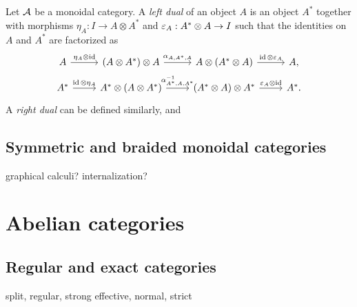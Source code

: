 \documentclass{../../large}
\begin{document}
\section{}

\begin{prb}
\end{prb}


\begin{prb}
Let $\mathcal{A}$ be a monoidal category.
A \emph{left dual} of an object $A$ is an object $A^*$ together with morphisms $\eta_A:I\to A\otimes A^*$ and $\varepsilon_A:A^*\otimes A\to I$ such that the identities on $A$ and $A^*$ are factorized as
\[\begin{tikzcd}[row sep=small]
A \rar{\eta_A\otimes\id} & (A\otimes A^*)\otimes A \rar{\alpha_{A,A^*,A}} & A\otimes(A^*\otimes A) \rar{\id\otimes\e_A} & A,\\
A^* \rar{\id\otimes\eta_A} & A^*\otimes(A\otimes A^*) \rar{\alpha_{A^*,A,A^*}^{-1}} & (A^*\otimes A)\otimes A^* \rar{\e_A\otimes\id} & A^*.
\end{tikzcd}\]
A \emph{right dual} can be defined similarly, and 
\end{prb}

\section{Symmetric and braided monoidal categories}

\begin{prb}
\end{prb}

\begin{prb}
\end{prb}

\begin{prb}
\end{prb}

graphical calculi?
internalization?


\chapter{Abelian categories}
\section{Regular and exact categories}

split, regular, strong
effective, normal, strict
\end{document}
